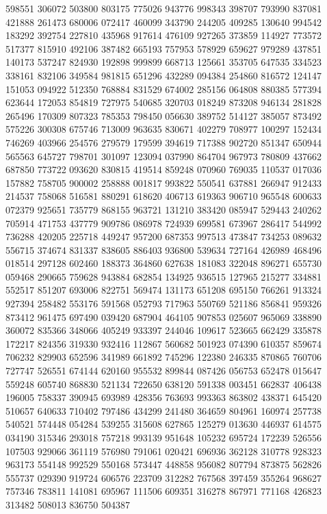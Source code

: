 {598551 306072 503800 803175 775026 943776 998343 398707 793990 837081 421888%
261473 680006 072417 460099 343790 244205 409285 130640 994542 183292 392754%
227810 435968 917614 476109 927265 373859 114927 773572 517377 815910 492106%
387482 665193 757953 578929 659627 979289 437851 140173 537247 824930 192898%
999899 668713 125661 353705 647535 334523 338161 832106 349584 981815 651296%
432289 094384 254860 816572 124147 151053 094922 512350 768884 831529 674002%
285156 064808 880385 577394 623644 172053 854819 727975 540685 320703 018249%
873208 946134 281828 265496 170309 807323 785353 798450 056630 389752 514127%
385057 873492 575226 300308 675746 713009 963635 830671 402279 708977 100297%
152434 746269 403966 254576 279579 179599 394619 717388 902720 851347 650944%
565563 645727 798701 301097 123094 037990 864704 967973 780809 437662 687850%
773722 093620 830815 419514 859248 070960 769035 110537 017036 157882 758705%
900002 258888 001817 993822 550541 637881 266947 912433 214537 758068 516581%
880291 618620 406713 619363 906710 965548 600633 072379 925651 735779 868155%
963721 131210 383420 085947 529443 240262 705914 471753 437779 909786 086978%
724939 699581 673967 286417 544992 736288 420205 225718 449247 957200 687353%
997513 473847 734253 089632 556715 374674 831337 838605 886403 936800 539634%
727164 426989 468496 018514 297128 602460 188373 364860 627638 181083 322048%
896271 655730 059468 290665 759628 943884 682854 134925 936515 127965 215277%
334881 552517 851207 693006 822751 569474 131173 651208 695150 766261 913324%
927394 258482 553176 591568 052793 717963 550769 521186 856841 959326 873412%
961475 697490 039420 687904 464105 907853 025607 965069 338890 360072 835366%
348066 405249 933397 244046 109617 523665 662429 335878 172217 824356 319330%
932416 112867 560682 501923 074390 610357 859674 706232 829903 652596 341989%
661892 745296 122380 246335 870865 760706 727747 526551 674144 620160 955532%
899844 087426 056753 652478 015647 559248 605740 868830 521134 722650 638120%
591338 003451 662837 406438 196005 758337 390945 693989 428356 763693 993363%
863802 438371 645420 510657 640633 710402 797486 434299 241480 364659 804961%
160974 257738 540521 574448 054284 539255 315608 627865 125279 013630 446937%
614575 034190 315346 293018 757218 993139 951648 105232 695724 172239 526556%
107503 929066 361119 576980 791061 020421 696936 362128 310778 928323 963173%
554148 992529 550168 573447 448858 956082 807794 873875 562826 555737 029390%
919724 606576 223709 312282 767568 397459 355264 968627 757346 783811 141081%
695967 111506 609351 316278 867971 771168 426823 313482 508013 836750 504387%
}
